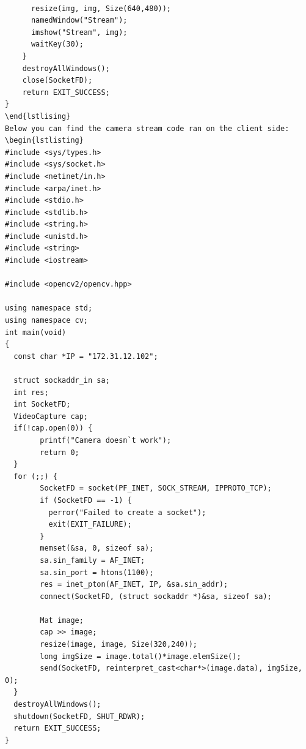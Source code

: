 \documentclass[conference]{IEEEtran}
\begin{document}
\begin{lstlisting}
        
      resize(img, img, Size(640,480));
      namedWindow("Stream");
      imshow("Stream", img);
      waitKey(30);
    }
    destroyAllWindows();
    close(SocketFD);
    return EXIT_SUCCESS;  
}
\end{lstlising}
Below you can find the camera stream code ran on the client side:
\begin{lstlisting}
#include <sys/types.h>
#include <sys/socket.h>
#include <netinet/in.h>
#include <arpa/inet.h>
#include <stdio.h>
#include <stdlib.h>
#include <string.h>
#include <unistd.h>
#include <string>
#include <iostream>

#include <opencv2/opencv.hpp>

using namespace std;
using namespace cv;
int main(void)
{
  const char *IP = "172.31.12.102";
  
  struct sockaddr_in sa;
  int res;
  int SocketFD;
  VideoCapture cap;
  if(!cap.open(0)) {
        printf("Camera doesn`t work");
        return 0;
  }
  for (;;) {
        SocketFD = socket(PF_INET, SOCK_STREAM, IPPROTO_TCP);
        if (SocketFD == -1) {
          perror("Failed to create a socket");
          exit(EXIT_FAILURE);
        } 
        memset(&sa, 0, sizeof sa);
        sa.sin_family = AF_INET;
        sa.sin_port = htons(1100);
        res = inet_pton(AF_INET, IP, &sa.sin_addr);
        connect(SocketFD, (struct sockaddr *)&sa, sizeof sa);
        
        Mat image;
        cap >> image;
        resize(image, image, Size(320,240));
        long imgSize = image.total()*image.elemSize();
        send(SocketFD, reinterpret_cast<char*>(image.data), imgSize, 0);
  }
  destroyAllWindows();
  shutdown(SocketFD, SHUT_RDWR);
  return EXIT_SUCCESS;
}
\end{lstlisting}
\end{document}

